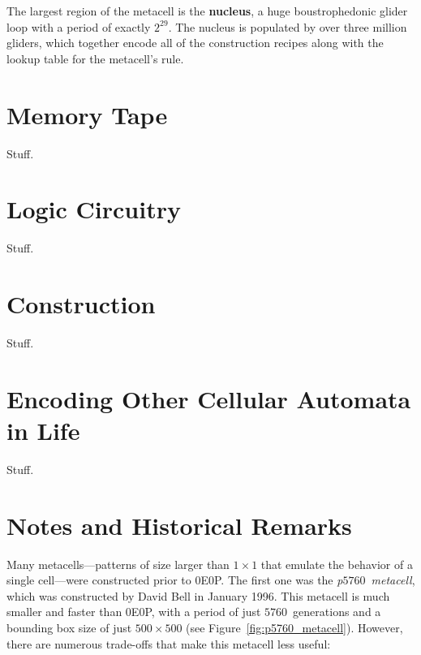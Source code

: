 The largest region of the metacell is the \textbf{nucleus}, a huge
boustrophedonic glider loop with a period of exactly $2^{29}$. The nucleus
is populated by over three million gliders, which together encode all of
the construction recipes along with the lookup table for the metacell's rule.

\section{Memory Tape}

Stuff.

\section{Logic Circuitry}

Stuff.

\section{Construction}

Stuff.

\section{Encoding Other Cellular Automata in Life}

Stuff.



\section{Notes and Historical Remarks}\label{sec:0e0p_history}

Many metacells---patterns of size larger than $1 \times 1$ that emulate the behavior of a single cell---were constructed prior to 0E0P. The first one was the \emph{p$5760$~metacell}, which was constructed by David Bell in January 1996. This metacell is much smaller and faster than 0E0P, with a period of just $5760$~generations and a bounding box size of just $500 \times 500$ (see Figure~\ref{fig:p5760_metacell}). However, there are numerous trade-offs that make this metacell less useful:\smallskip

